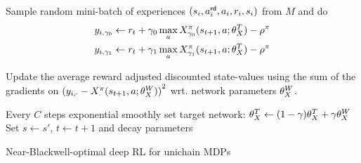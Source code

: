 \documentclass[envcountsame]{llncs}
\begin{document}
\begin{algorithm}[t!]
\begin{algorithmic}[1]
    \State{}Sample random mini-batch of experiences \((s_{i}, a_{i}^{\mathsf{rd}}, a_{i}, r_{i}, s_{i})\)
    from \(M\) and do
    \begin{align*}
      y_{i,\gamma_0} & \gets r_{t} + \gamma_{0} \max_{a}
                                        X^\pi_{\gamma_0}(s_{t+1},a; \theta_X^{T}{}) - \rho^{\pi} \\
      y_{i,\gamma_{1}} & \gets r_{t} + \gamma_{1} \max_{a}
                                        X^\pi_{\gamma_1}(s_{t+1},a; \theta_X^{T}{}) - \rho^{\pi}
    \end{align*}
    \State{} \begin{minipage}[t]{\dimexpr\textwidth-\leftmargin-\labelsep-\labelwidth} Update the average reward adjusted discounted
      state-values using the sum of the gradients on \({(y_{i,\cdot} -
      X^\pi_{\cdot}(s_{t+1},a; \theta_X^{W}{}))}^{2}\) wrt. network parameters
    \(\theta_X^{W}{}\).
    \end{minipage}
    \State{} Every \(C\) steps exponential smoothly set target network:
      \(\theta_X^{T} \gets (1 - \gamma) \theta_X^{T}{} + \gamma \theta_X^{W}{}\)
    \State{} Set \(s \gets s'\), \(t \gets t+1\) and decay parameters
    \EndWhile{}
  \end{algorithmic}
  \caption{\label{alg:near}Near-Blackwell-optimal deep RL for unichain MDPs}
\end{algorithm}
\end{document}
